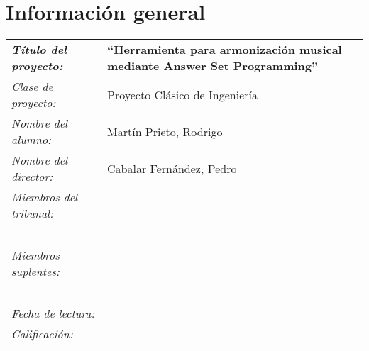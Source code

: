 \thispagestyle{empty}
\section*{Información general}
\vfill
\begin{center}
\begin{tabular}{p{4.5cm}p{9cm}}
\textbf{\emph{Título del proyecto:}} & \textbf{``Herramienta para armonización musical mediante Answer Set Programming''} \\[0.5cm]
\emph{Clase de proyecto:} & Proyecto Clásico de Ingeniería \\[0.5cm]
\emph{Nombre del alumno:} & Martín Prieto, Rodrigo \\[0.5cm]
\emph{Nombre del director:} & Cabalar Fernández, Pedro \\[0.5cm]
\emph{Miembros del tribunal:} & \\[0.5cm]
& \\
& \\
& \\
& \\
& \\
\emph{Miembros suplentes:} & \\[0.5cm]
& \\
& \\
& \\
& \\
& \\
\emph{Fecha de lectura:} & \\[0.5cm]
\emph{Calificación:} & \\
\end{tabular}
\end{center}
\vfill
